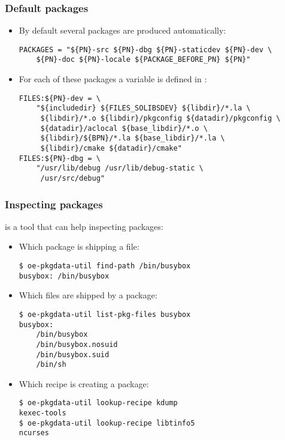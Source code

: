 \begin{frame}[fragile]
  \frametitle{Default packages}
  \begin{itemize}
    \item By default several packages are produced automatically:
    \begin{block}{}
    \begin{verbatim}
PACKAGES = "${PN}-src ${PN}-dbg ${PN}-staticdev ${PN}-dev \
    ${PN}-doc ${PN}-locale ${PACKAGE_BEFORE_PN} ${PN}"
    \end{verbatim}
    \end{block}
    \item For each of these packages a  variable is
      defined in :
    \begin{block}{}
    \begin{verbatim}
FILES:${PN}-dev = \
    "${includedir} ${FILES_SOLIBSDEV} ${libdir}/*.la \
     ${libdir}/*.o ${libdir}/pkgconfig ${datadir}/pkgconfig \
     ${datadir}/aclocal ${base_libdir}/*.o \
     ${libdir}/${BPN}/*.la ${base_libdir}/*.la \
     ${libdir}/cmake ${datadir}/cmake"
FILES:${PN}-dbg = \
    "/usr/lib/debug /usr/lib/debug-static \
     /usr/src/debug"
    \end{verbatim}
    \end{block}
  \end{itemize}
\end{frame}

\begin{frame}[fragile]
  \frametitle{Inspecting packages}
   is a tool that can help inspecting
  packages:
  \begin{itemize}
  \item Which package is shipping a file:
    \begin{block}{}
      \begin{verbatim}
$ oe-pkgdata-util find-path /bin/busybox
busybox: /bin/busybox
    \end{verbatim}
    \end{block}
  \item Which files are shipped by a package:
    \begin{block}{}
      \begin{verbatim}
$ oe-pkgdata-util list-pkg-files busybox
busybox:
    /bin/busybox
    /bin/busybox.nosuid
    /bin/busybox.suid
    /bin/sh
    \end{verbatim}
    \end{block}
  \item Which recipe is creating a package:
    \begin{block}{}
      \begin{verbatim}
$ oe-pkgdata-util lookup-recipe kdump
kexec-tools
$ oe-pkgdata-util lookup-recipe libtinfo5
ncurses
    \end{verbatim}
    \end{block}
\end{itemize}
\end{frame}
